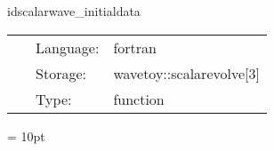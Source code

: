\vspace{5mm}


\hspace{5mm} idscalarwave\_initialdata 

\hspace{5mm}{\it initial data for 3d wave equation } 


\hspace{5mm}

 \begin{tabular*}{160mm}{cll} 
~ & Language:  & fortran \\ 
~ & Storage:  & wavetoy::scalarevolve[3] \\ 
~ & Type:  & function \\ 
\end{tabular*} 



\vspace{5mm}\parskip = 10pt 
